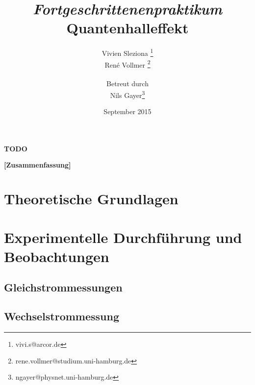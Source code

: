 \documentclass[12pt,a4paper]{article}
\begin{document}
	
	\textbf{TODO}
	
	
	
	\title{\textit{Fortgeschrittenenpraktikum}\\\textbf{Quantenhalleffekt} }
	\date{September 2015}
	\author{Vivien Sleziona \footnote{vivi.s@arcor.de}\\ René Vollmer \footnote{rene.vollmer@studium.uni-hamburg.de} \\ \\Betreut durch\\ Nils Gayer\footnote{ngayer@physnet.uni-hamburg.de}}
	
	\maketitle
	
	\begin{center} 
		\bigskip
		\bigskip
		
		\begin{minipage}{0.75\textwidth}
			\textbf{[Zusammenfassung]}
			
		\end{minipage}
	\end{center}
	
	\newpage
	
	\tableofcontents
	\vfill
	\newpage
	\clearpage	
	
	
	\section{Theoretische Grundlagen}
	

	
	\newpage
	\clearpage
	
	\section{Experimentelle Durchführung und Beobachtungen}
	
	
	\subsection{Gleichstrommessungen}
	\label{ch:dc}
	
	\subsection{Wechselstrommessung}
	\label{ch:ac}
	
\end{document}
